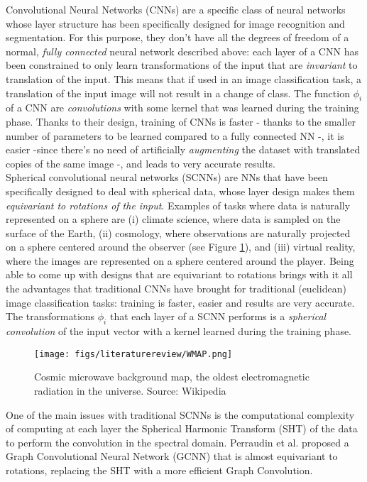 Convolutional Neural Networks (CNNs) are a specific class of neural networks whose layer structure has been specifically designed for image recognition and segmentation. For this purpose, they don't have all the degrees of freedom of a normal, \textit{fully connected} neural network described above: each layer of a CNN has been constrained to only learn transformations of the input that are \textit{invariant} to translation of the input. This means that if used in an image classification task, a translation of the input image will not result in a change of class. The function $\phi_i$ of a CNN are \textit{convolutions} with some kernel that was learned during the training phase. Thanks to their design, training of CNNs is faster - thanks to the smaller number of parameters to be learned compared to a fully connected NN -, it is easier -since there's no need of artificially \textit{augmenting} the dataset with translated copies of the same image -, and leads to very accurate results.\\

Spherical convolutional neural networks (SCNNs) are NNs that have been specifically designed to deal with spherical data, whose layer design makes them \textit{equivariant to rotations of the input}.  Examples of tasks where data is naturally represented on a sphere are (i) climate science, where data is sampled on the surface of the Earth, (ii) cosmology, where observations are naturally projected on a sphere centered around the observer (see Figure \ref{fig:cosmicradiation}), and (iii) virtual reality, where the images are represented on a sphere centered around the player. Being able to come up with designs that are equivariant to rotations brings with it all the advantages that traditional CNNs have brought for traditional (euclidean) image classification tasks: training is faster, easier and results are very accurate. The transformations $\phi_i$ that each layer of a SCNN performs is a \textit{spherical convolution} of the input vector with a kernel learned during the training phase. 

\begin{figure}
	\centering
	\caption{\label{fig:cosmicradiation} Cosmic microwave background map, the oldest electromagnetic radiation in the universe. Source: Wikipedia}
	\texttt{[image: figs/literaturereview/WMAP.png]}
\end{figure}
One of the main issues with traditional SCNNs is the computational complexity of computing at each layer the Spherical Harmonic Transform (SHT) of the data to perform the convolution in the spectral domain. Perraudin et al. \cite{DeepSphere} proposed a Graph Convolutional Neural Network (GCNN) that is almost equivariant to rotations, replacing the SHT with a more efficient Graph Convolution.

